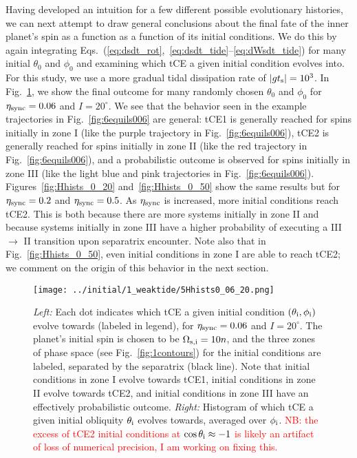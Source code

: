 \documentclass[
        fleqn,
        usenatbib,
        referee,
    ]{mnras}
\newcommand*{\abs}[1]{\left|#1\right|}
\newlength{\colummwidth}
\begin{document}
Having developed an intuition for a few different possible evolutionary
histories, we can next attempt to draw general conclusions about the final fate
of the inner planet's spin as a function as a function of its initial
conditions. We do this by again integrating
Eqs.~(\ref{eq:dsdt_rot},~\ref{eq:dsdt_tide}--\ref{eq:dWsdt_tide}) for many
initial $\theta_0$ and $\phi_0$ and examining which tCE a given initial
condition evolves into. For this study, we use a more gradual tidal dissipation
rate of $\abs{gt_{\rm s}} = 10^3$. In Fig.~\ref{fig:Hhists_0_06}, we show the
final outcome for many randomly chosen $\theta_0$ and $\phi_0$ for $\eta_{\rm
sync} = 0.06$ and $I = 20^\circ$. We see that the behavior seen in the example
trajectories in Fig.~\ref{fig:6equils006} are general: tCE1 is generally reached
for spins initially in zone I (like the purple trajectory in
Fig.~\ref{fig:6equils006}), tCE2 is generally reached for spins initially in
zone II (like the red trajectory in Fig.~\ref{fig:6equils006}), and a
probabilistic outcome is observed for spins initially in zone III (like the
light blue and pink trajectories in Fig.~\ref{fig:6equils006}).
Figures~\ref{fig:Hhists_0_20} and~\ref{fig:Hhists_0_50} show the same results
but for $\eta_{\rm sync} = 0.2$ and $\eta_{\rm sync} = 0.5$. As $\eta_{\rm
sync}$ is increased, more initial conditions reach tCE2. This is both because
there are more systems initially in zone II and because systems initially in
zone III have a higher probability of executing a III $\to$ II transition upon
separatrix encounter. Note also that in Fig.~\ref{fig:Hhists_0_50}, even initial
conditions in zone I are able to reach tCE2; we comment on the origin of this
behavior in the next section.
\begin{figure}
    \centering
    \texttt{[image: ../initial/1\_weaktide/5Hhists0\_06\_20.png]}
    \caption{\emph{Left:} Each dot indicates which tCE a given initial condition
    $(\theta_{\rm i}, \phi_{\rm i})$ evolve towards (labeled in legend), for
    $\eta_{\rm sync} = 0.06$ and $I = 20^\circ$. The planet's initial spin is
    chosen to be $\Omega_{\rm s, i} = 10n$, and the three zones of phase space
    (see Fig.~\ref{fig:1contours}) for the initial conditions are labeled,
    separated by the separatrix (black line). Note that initial conditions in
    zone I evolve towards tCE1, initial conditions in zone II evolve towards
    tCE2, and initial conditions in zone III have an effectively probabilistic
    outcome. \emph{Right:} Histogram of which tCE a given initial obliquity
    $\theta_{\rm i}$ evolves towards, averaged over $\phi_{\rm
    i}$.
    \textcolor{red}{NB\@: the excess of tCE2 initial conditions at $\cos
    \theta_{\rm i} \approx -1$ is likely an artifact of loss of numerical
    precision, I am working on fixing this.}
    }\label{fig:Hhists_0_06}
\end{figure}
\end{document}
